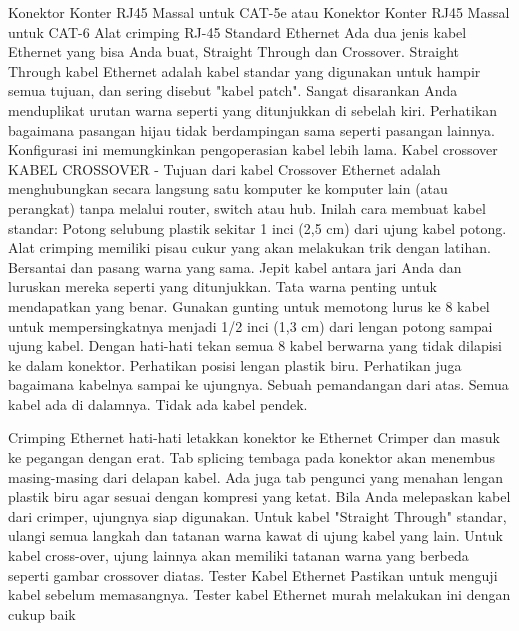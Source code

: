 Konektor Konter RJ45 Massal untuk CAT-5e atau Konektor Konter RJ45 Massal untuk CAT-6
Alat crimping RJ-45
Standard Ethernet Ada dua jenis kabel Ethernet yang bisa Anda buat, Straight Through dan Crossover.
Straight Through kabel Ethernet adalah kabel standar yang digunakan untuk hampir semua tujuan, dan sering disebut "kabel patch". Sangat disarankan Anda menduplikat urutan warna seperti yang ditunjukkan di sebelah kiri. Perhatikan bagaimana pasangan hijau tidak berdampingan sama seperti pasangan lainnya. Konfigurasi ini memungkinkan pengoperasian kabel lebih lama.
Kabel crossover
KABEL CROSSOVER - Tujuan dari kabel Crossover Ethernet adalah menghubungkan secara langsung satu komputer ke komputer lain (atau perangkat) tanpa melalui router, switch atau hub.
Inilah cara membuat kabel standar:
Potong selubung plastik sekitar 1 inci (2,5 cm) dari ujung kabel potong. Alat crimping memiliki pisau cukur yang akan melakukan trik dengan latihan.
Bersantai dan pasang warna yang sama.
Jepit kabel antara jari Anda dan luruskan mereka seperti yang ditunjukkan. Tata warna penting untuk mendapatkan yang benar.
Gunakan gunting untuk memotong lurus ke 8 kabel untuk mempersingkatnya menjadi 1/2 inci (1,3 cm) dari lengan potong sampai ujung kabel.
Dengan hati-hati tekan semua 8 kabel berwarna yang tidak dilapisi ke dalam konektor. Perhatikan posisi lengan plastik biru. Perhatikan juga bagaimana kabelnya sampai ke ujungnya.
Sebuah pemandangan dari atas. Semua kabel ada di dalamnya. Tidak ada kabel pendek.
 

Crimping Ethernet
hati-hati letakkan konektor ke Ethernet Crimper dan masuk ke pegangan dengan erat. Tab splicing tembaga pada konektor akan menembus masing-masing dari delapan kabel. Ada juga tab pengunci yang menahan lengan plastik biru agar sesuai dengan kompresi yang ketat. Bila Anda melepaskan kabel dari crimper, ujungnya siap digunakan.
Untuk kabel "Straight Through" standar, ulangi semua langkah dan tatanan warna kawat di ujung kabel yang lain. Untuk kabel cross-over, ujung lainnya akan memiliki tatanan warna yang berbeda seperti gambar crossover diatas.
Tester Kabel Ethernet
Pastikan untuk menguji kabel sebelum memasangnya. Tester kabel Ethernet murah melakukan ini dengan cukup baik

\cite{caniggia2003common}
\cite{jakovljevic2008common}
\cite{ueda2011transmission}
